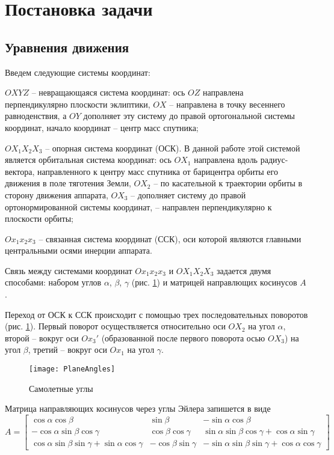 \section{Постановка задачи}
\subsection{Уравнения движения}
\noindent\indent Введем следующие системы координат:\par
\noindent $OXYZ$ -- невращающаяся система координат: ось $OZ$ направлена
перпендикулярно плоскости эклиптики, $OX$ -- направлена в точку весеннего
равноденствия, а $OY$ дополняет эту систему до правой ортогональной системы
координат, начало координат -- центр масс спутника;\par
\noindent $OX_1X_2X_3$ -- опорная система координат (ОСК). В данной работе
этой системой является орбитальная система координат: ось $OX_1$ направлена вдоль
радиус-вектора, направленного к центру масс спутника от барицентра орбиты его движения
 в поле тяготения Земли, $OX_2$ -- по касательной к траектории орбиты в сторону
движения аппарата, $OX_3$ -- дополняет систему до правой ортонормированной системы
координат, -- направлен перпендикулярно к плоскости орбиты;\par
\noindent $Ox_1x_2x_3$ -- связанная система координат (ССК), оси которой являются
главными центральными осями инерции аппарата.\par
    Связь между системами координат $Ox_1x_2x_3$ и $OX_1X_2X_3$ задается двумя
способами: набором углов $\alpha$, $\beta$, $\gamma$ (рис. \ref{fig:KrilovAngles})
и матрицей направлющих косинусов $A$.\par
    Переход от ОСК к ССК происходит с помощью трех последовательных поворотов
(рис. \ref{fig:KrilovAngles}). Первый поворот осуществляется относительно оси $OX_2$
на угол $\alpha$, второй -- вокруг оси $Ox_3'$ (образованной после первого поворота
осью $OX_3$) на угол $\beta$, третий -- вокруг оси $Ox_1$ на угол $\gamma$.
\begin{figure}[h]
  \centering
  \texttt{[image: PlaneAngles]}
  \caption{Самолетные углы}
  \label{fig:KrilovAngles}
\end{figure}\par
    Матрица направляющих косинусов через углы Эйлера запишется в виде
\begin{equation}
    A = \begin{bmatrix}
        \cos\alpha\cos\beta & \sin\beta & -\sin\alpha\cos\beta\\
        -\cos\alpha\sin\beta\cos\gamma & \cos\beta\cos\gamma & \sin\alpha\sin\beta\cos\gamma + \cos\alpha\sin\gamma \\
        \cos\alpha\sin\beta\sin\gamma + \sin\alpha\cos\gamma & -\cos\beta\sin\gamma & -\sin\alpha\sin\beta\sin\gamma + \cos\alpha\cos\gamma
    \end{bmatrix}
\end{equation}
